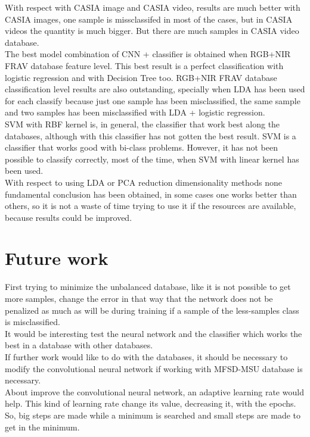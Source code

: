 With respect with CASIA image and CASIA video, results are much better with CASIA images, one sample is missclassifed in most of the cases, but in CASIA videos the quantity is much bigger. But there are much samples in CASIA video database.\\

The best model combination of CNN + classifier is obtained when RGB+NIR FRAV database feature level. This best result is a perfect classification with logistic regression and with Decision Tree too. RGB+NIR FRAV database classification level results are also outstanding, specially when LDA has been used for each classify because just one sample has been misclassified, the same sample and two samples has been misclassified with LDA + logistic regression.\\

SVM with RBF kernel is, in general, the classifier that work best along the databases, although with this classifier has not gotten the best result. SVM is a classifier that works good with bi-class problems. However, it has not been possible to classify correctly, most of the time, when SVM with linear kernel has been used.\\

With respect to using LDA or PCA reduction dimensionality methods none fundamental conclusion has been obtained, in some cases one works better than others, so it is not a waste of time trying to use it if the resources are available, because results could be improved.\\


\section{Future work}
First trying to minimize the unbalanced database, like it is not possible to get more samples, change the error in that way that the network does not be penalized as much as will be during training if a sample of the less-samples class  is misclassified.\\

It would be interesting test the neural network and the classifier which works the best in a database with other databases. \\

If further work would like to do with the databases, it should be necessary to modify the convolutional neural network if working with MFSD-MSU database is necessary.\\

About improve the convolutional neural network, an adaptive learning rate would help. This kind of learning rate change its value, decreasing it, with the epochs. So, big steps are made while a minimum is searched and small steps are made to get in the minimum.\\
